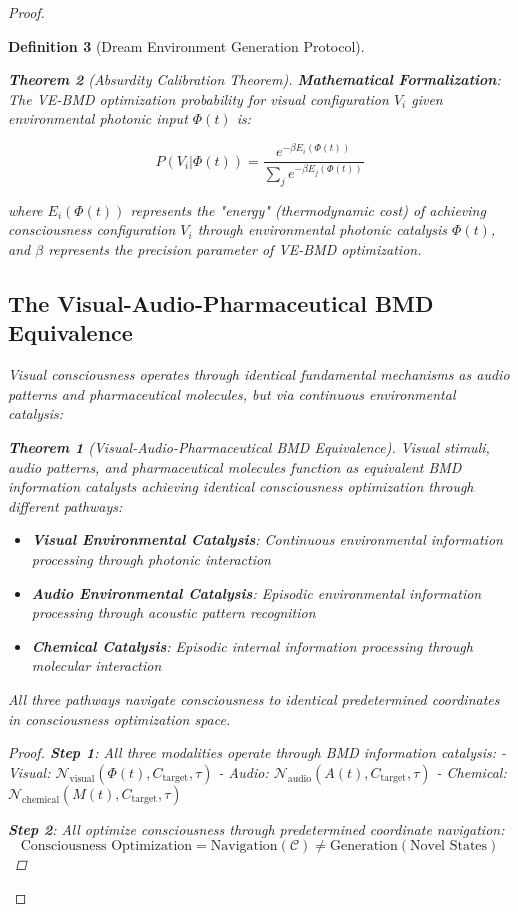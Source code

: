 \documentclass[12pt,a4paper]{article}
\newtheorem{theorem}{Theorem}[section]
\newtheorem{definition}[theorem]{Definition}
\begin{document}
\begin{proof}
\begin{definition}[Dream Environment Generation Protocol]
\begin{theorem}[Absurdity Calibration Theorem]
\textbf{Mathematical Formalization}:
The VE-BMD optimization probability for visual configuration $V_i$ given environmental photonic input $\Phi(t)$ is:

$$P(V_i | \Phi(t)) = \frac{e^{-\beta E_i(\Phi(t))}}{\sum_j e^{-\beta E_j(\Phi(t))}}$$

where $E_i(\Phi(t))$ represents the "energy" (thermodynamic cost) of achieving consciousness configuration $V_i$ through environmental photonic catalysis $\Phi(t)$, and $\beta$ represents the precision parameter of VE-BMD optimization.

\subsection{The Visual-Audio-Pharmaceutical BMD Equivalence}

Visual consciousness operates through identical fundamental mechanisms as audio patterns and pharmaceutical molecules, but via continuous environmental catalysis:

\begin{theorem}[Visual-Audio-Pharmaceutical BMD Equivalence]
Visual stimuli, audio patterns, and pharmaceutical molecules function as equivalent BMD information catalysts achieving identical consciousness optimization through different pathways:
\begin{itemize}
\item \textbf{Visual Environmental Catalysis}: Continuous environmental information processing through photonic interaction
\item \textbf{Audio Environmental Catalysis}: Episodic environmental information processing through acoustic pattern recognition
\item \textbf{Chemical Catalysis}: Episodic internal information processing through molecular interaction
\end{itemize}
All three pathways navigate consciousness to identical predetermined coordinates in consciousness optimization space.
\end{theorem}

\begin{proof}
\textbf{Step 1}: All three modalities operate through BMD information catalysis:
- Visual: $\mathcal{N}_{\text{visual}}(\Phi(t), C_{\text{target}}, \tau)$
- Audio: $\mathcal{N}_{\text{audio}}(A(t), C_{\text{target}}, \tau)$
- Chemical: $\mathcal{N}_{\text{chemical}}(M(t), C_{\text{target}}, \tau)$

\textbf{Step 2}: All optimize consciousness through predetermined coordinate navigation:
$$\text{Consciousness Optimization} = \text{Navigation}(\mathcal{C}) \neq \text{Generation}(\text{Novel States})$$


\end{proof}
\end{theorem}
\end{definition}
\end{proof}
\end{document}

